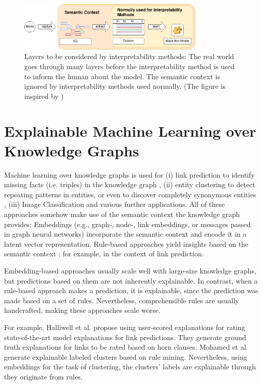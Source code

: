 \begin{figure}
    \centering
    \includegraphics[width=0.8\textwidth]{images/related_work.png}
    \caption{Layers to be considered by interpretability methods: The real world goes through many layers before the interpretability method is used to inform the human about the model. The semantic context is ignored by interpretability methods used normally. (The figure is inspired by \cite{molnar2020interpretable})}    
    \label{fig:related_work_intepretability_methods}
\end{figure}

\section{Explainable Machine Learning over Knowledge Graphs}
Machine learning over knowledge graphs is used for (i) link prediction to identify missing facts (i.e. triples) in the knowledge graph \cite{link_prediction_analysis}, (ii) entity clustering to detect repeating patterns in entities, or even to discover completely synonymous entities \cite{entity_clustering}, (iii) Image Classification \cite{image_classification} and various further applications. All of these approaches somehow make use of the semantic context the knowledge graph provides: Embeddings (e.g., graph-, node-, link embeddings, or messages passed in graph neural networks) incorporate the semantic context and encode it in a latent vector representation. Rule-based approaches yield insights based on the semantic context \cite{rule_based_learning}; for example, in the context of link prediction.

Embedding-based approaches usually scale well with large-size knowledge graphs, but predictions based on them are not inherently explainable. In contrast, when a rule-based approach makes a prediction, it is explainable, since the prediction was made based on a set of rules. Nevertheless, comprehensible rules are usually handcrafted, making these approaches scale worse. 

For example, Halliwell et al. \cite{Halliwell2021} propose using user-scored explanations for rating state-of-the-art model explanations for link predictions. They generate ground truth explanations for links to be rated based on horn clauses. Mohamed et al. \cite{excut} generate explainable labeled clusters based on rule mining. Nevertheless, using embeddings for the task of clustering, the clusters' labels are explainable through they originate from rules. 

